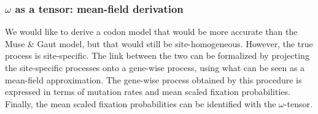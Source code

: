 \subsubsection{\texorpdfstring{$\omega$}{ω} as a tensor: mean-field derivation}

We would like to derive a codon model that would be more accurate than the Muse \& Gaut model, but that would still be site-homogeneous.
However, the true process is site-specific.
The link between the two can be formalized by projecting the site-specific processes onto a gene-wise process, using what can be seen as a mean-field approximation.
The gene-wise process obtained by this procedure is expressed in terms of mutation rates and mean scaled fixation probabilities.
Finally, the mean scaled fixation probabilities can be identified with the $\omega$-tensor.

